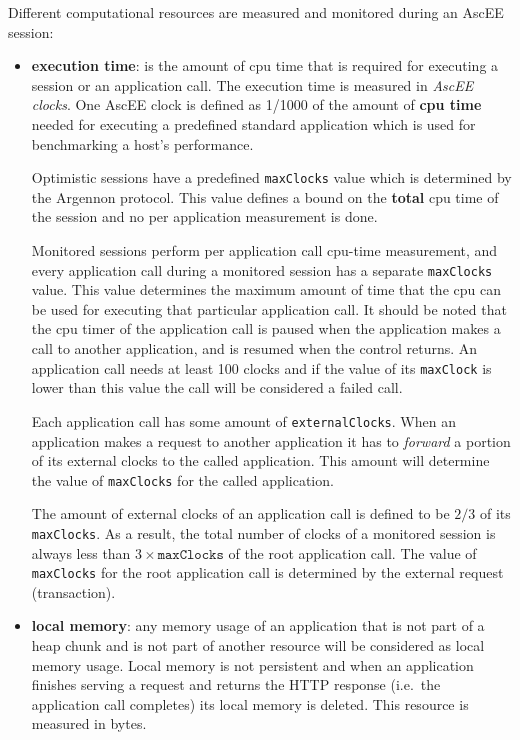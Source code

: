 Different computational resources are measured and monitored during an AscEE session:
\begin{itemize}
    \item \textbf{execution time}:
    is the amount of cpu time that is required for executing a session or an application call. The execution time is
    measured in \emph{AscEE clocks}. One AscEE clock is defined as 1/1000 of the amount
    of \textbf{cpu time} needed for executing a predefined standard application which is used for benchmarking a host's
    performance.

    Optimistic sessions have a predefined \texttt{maxClocks} value which is determined by the Argennon protocol. This
    value defines a bound on the \textbf{total} cpu time of the session and no per application measurement is done.

    Monitored sessions perform per application call cpu-time measurement, and every application call during a monitored
    session has a separate \texttt{maxClocks} value. This value determines the maximum amount of time that the cpu
    can be used for executing that particular application call. It should be noted that the cpu timer of the
    application call is paused when the application makes a call to another application, and is resumed when the
    control returns. An application call
    needs at least 100 clocks and if the value of its \texttt{maxClock} is lower than this value the call will be
    considered a failed call.

    Each application call has some amount of \texttt{externalClocks}. When an application makes a request to another
    application it has to \emph{forward} a portion of its external clocks to the called application. This amount
    will determine the value of \texttt{maxClocks} for the called application.

    The amount of external clocks of an application
    call is defined to be \(2/3\) of its \texttt{maxClocks}. As a result, the total number of clocks of a monitored
    session is always less than \(3 \times \texttt{maxClocks}\) of the root application call. The value of
    \texttt{maxClocks} for
    the root application call is determined by the external request (transaction).

    \item \textbf{local memory}:
    any memory usage of an application that is not part of a heap chunk and is not part of another resource
    will be considered as local memory usage. Local memory is not persistent and when an application finishes serving a
    request and returns the HTTP response (i.e.\ the application call completes) its local memory is deleted.
    This resource is measured in bytes.


\end{itemize}
